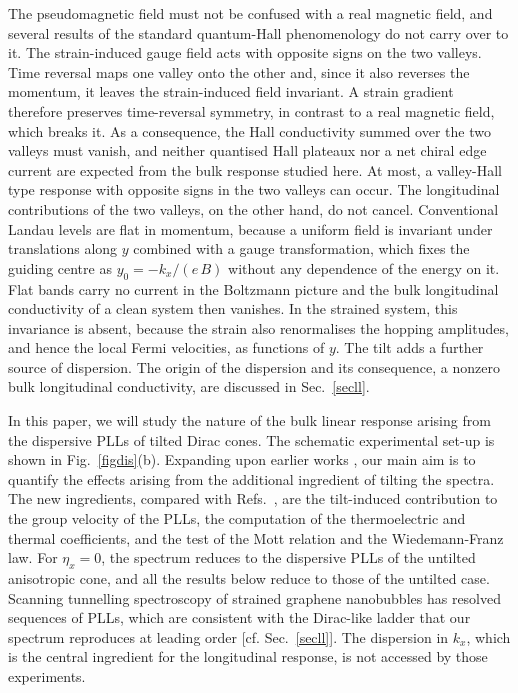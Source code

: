 \documentclass[aps,prb, onecolumn, nofootinbib, citeautoscript,10pt]{revtex4-2}
\begin{document}
The pseudomagnetic field must not be confused with a real magnetic field, and several results of the standard quantum-Hall phenomenology do not carry over to it. The strain-induced gauge field acts with opposite signs on the two valleys. Time reversal maps one valley onto the other and, since it also reverses the momentum, it leaves the strain-induced field invariant. A strain gradient therefore preserves time-reversal symmetry, in contrast to a real magnetic field, which breaks it. As a consequence, the Hall conductivity summed over the two valleys must vanish, and neither quantised Hall plateaux nor a net chiral edge current are expected from the bulk response studied here. At most, a valley-Hall type response with opposite signs in the two valleys can occur. The longitudinal contributions of the two valleys, on the other hand, do not cancel. Conventional Landau levels are flat in momentum, because a uniform field is invariant under translations along $y$ combined with a gauge transformation, which fixes the guiding centre as $y_0=-k_x/(e\,B)$ without any dependence of the energy on it. Flat bands carry no current in the Boltzmann picture and the bulk longitudinal conductivity of a clean system then vanishes. In the strained system, this invariance is absent, because the strain also renormalises the hopping amplitudes, and hence the local Fermi velocities, as functions of $y$. The tilt adds a further source of dispersion. The origin of the dispersion and its consequence, a nonzero bulk longitudinal conductivity, are discussed in Sec.~\ref{secll}.




In this paper, we will study the nature of the bulk linear response arising from the dispersive PLLs of tilted Dirac cones. The schematic experimental set-up is shown in Fig.~\ref{figdis}(b). Expanding upon earlier works \cite{strained-dirac-franz, complex-LL-strained-graphene}, our main aim is to quantify the effects arising from the additional ingredient of tilting the spectra. The new ingredients, compared with Refs.~\cite{strained-dirac-franz, complex-LL-strained-graphene}, are the tilt-induced contribution to the group velocity of the PLLs, the computation of the thermoelectric and thermal coefficients, and the test of the Mott relation and the Wiedemann-Franz law. For $\eta_x=0$, the spectrum reduces to the dispersive PLLs of the untilted anisotropic cone, and all the results below reduce to those of the untilted case. Scanning tunnelling spectroscopy of strained graphene nanobubbles \cite{levy10} has resolved sequences of PLLs, which are consistent with the Dirac-like ladder that our spectrum reproduces at leading order [cf. Sec.~\ref{secll}]. The dispersion in $k_x$, which is the central ingredient for the longitudinal response, is not accessed by those experiments. 
\end{document}
